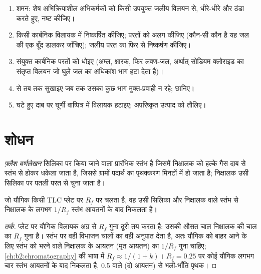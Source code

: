 \begin{method}[अभिक्रिया फ़्लास्क से अपरिष्कृत उत्पाद तक]\label{met:b2:lab-techniques-2:work-up}
\begin{enumerate}
  \item शमन: शेष अभिक्रियाशील अभिकर्मकों को किसी उपयुक्त जलीय विलयन से, धीरे-धीरे और
        ठंडा करते हुए, नष्ट कीजिए।
  \item किसी कार्बनिक विलायक में निष्कर्षित कीजिए; परतों को अलग कीजिए (कौन-सी कौन है यह जल की एक बूँद
        डालकर जाँचिए); जलीय परत का फिर से निष्कर्षण कीजिए।
  \item संयुक्त कार्बनिक परतों को धोइए (अम्ल, क्षारक, फिर लवण-जल, अर्थात् सोडियम क्लोराइड का संतृप्त विलयन
        जो घुले जल का अधिकांश भाग हटा देता है)।
  \item {} से तब तक सुखाइए जब तक उसका कुछ भाग मुक्त-प्रवाही न रहे; छानिए।
  \item घटे हुए दाब पर घूर्णी वाष्पित्र में विलायक हटाइए; अपरिष्कृत उत्पाद को तौलिए।
\end{enumerate}
\end{method}

\section{शोधन}

\begin{definition}[फ़्लैश वर्णलेखन]\label{def:b2:lab-techniques-2:flash}
\emph{फ़्लैश वर्णलेखन} सिलिका पर किया जाने वाला प्रारंभिक स्तंभ  है जिसमें
निक्षालक को हल्के गैस दाब से स्तंभ से होकर धकेला जाता है, जिससे ग्रामों पदार्थ का पृथक्करण
मिनटों में हो जाता है; निक्षालक उसी सिलिका पर पतली परत  से चुना जाता है।
\end{definition}

\begin{proposition}[स्तंभ आयतन]\label{prop:b2:lab-techniques-2:column-volumes}
जो यौगिक किसी TLC प्लेट पर $R_f$ पर चलता है, वह उसी सिलिका और निक्षालक वाले स्तंभ से
निक्षालक के लगभग $1/R_f$ स्तंभ आयतनों के बाद निकलता है।
\end{proposition}

\begin{proof}[तर्क]
प्लेट पर यौगिक विलायक अग्र से $R_f$ गुना दूरी तय करता है: उसकी औसत चाल निक्षालक की चाल का
$R_f$ गुना है। स्तंभ पर वही विभाजन चालों का वही अनुपात देता है, अतः
यौगिक को बाहर आने के लिए स्तंभ को भरने वाले निक्षालक के आयतन (मृत आयतन) का $1/R_f$ गुना
चाहिए; \cref{ch:b2:chromatography} की भाषा में $R_f \approx 1/(1 + k)$। $R_f = 0.25$ पर कोई यौगिक
लगभग चार स्तंभ आयतनों के बाद निकलता है, 0.5 वाले (दो आयतन) से भली-भाँति पृथक।
\end{proof}

